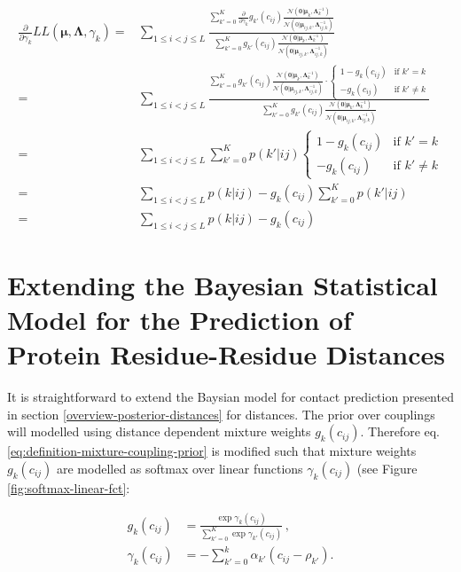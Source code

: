 \documentclass[11pt,a4paper,twoside]{book}
\newcommand{\Gauss}{\mathcal{N}}
\newcommand{\Lijk}{\mathbf{\Lambda}_{ij,k}}
\newcommand{\Lk}{\mathbf{\Lambda}_k}
\newcommand{\muijk}{\mathbf{\mu}_{ij,k}}
\newcommand{\muk}{\mathbf{\mu}_k}
\newcommand{\cij}{c_{ij}}
\theoremstyle{definition}
\theoremstyle{definition}
\theoremstyle{remark}
\begin{document}
\begin{align}
\frac{\partial} {\partial \gamma_k}     L\!L(\mathbf{\mu}, \mathbf{\Lambda}, \gamma_k) 
  =&  \sum_{1\le i<j\le L} \frac{\sum_{k'=0}^K  \frac{\partial}{\partial \gamma_k} g_{k'}(\cij)  
  \frac{\Gauss(\mathbf{0} | \muk, \Lk^{-1})}{\Gauss( 0 | \muijk, \Lijk^{-1})}}
  {\sum_{k'=0}^K g_{k'}(\cij)  \frac{  \Gauss(\mathbf{0} | \muk, \Lk^{-1})}{\Gauss( \mathbf{0} | \muijk, \Lijk^{-1})}} \nonumber \\
  =&  \sum_{1\le i<j\le L} \frac{\sum_{k'=0}^K  g_{k'}(\cij)  
  \frac{  \Gauss(\mathbf{0} | \muk, \Lk^{-1})}{\Gauss( \mathbf{0} | \muijk, \Lijk^{-1})} \cdot 
  \begin{cases} 
   1-g_k(\cij) & \text{if } k' = k \\
   -g_k(\cij)  & \text{if } k' \neq k
  \end{cases}}
  {\sum_{k'=0}^K g_{k'}(\cij)  \frac{  \Gauss(\mathbf{0} | \muk, \Lk^{-1})}{\Gauss( \mathbf{0} | \muijk, \Lijk^{-1})}} \nonumber\\
  =& \sum_{1\le i<j\le L} \sum_{k'=0}^K p(k'|ij) 
  \begin{cases} 
    1-g_k(\cij) & \text{if } k' = k \\
    -g_k(\cij)  & \text{if } k' \neq k 
  \end{cases} \nonumber\\
  =& \sum_{1 \leq i<j\leq L} p(k|ij) - g_k(\cij) \sum_{k'=0}^K p(k'|ij) \nonumber\\
  =& \sum_{1 \leq i<j\leq L} p(k|ij) - g_k(\cij)
\end{align}

\section{Extending the Bayesian Statistical Model for the Prediction of
Protein Residue-Residue
Distances}\label{extending-the-bayesian-statistical-model-for-the-prediction-of-protein-residue-residue-distances}

It is straightforward to extend the Baysian model for contact prediction
presented in section \ref{overview-posterior-distances} for distances.
The prior over couplings will modelled using distance dependent mixture
weights \(g_k(\cij)\). Therefore eq.
\eqref{eq:definition-mixture-coupling-prior} is modified such that mixture
weights \(g_k(\cij)\) are modelled as softmax over linear functions
\(\gamma_k(\cij)\) (see Figure \ref{fig:softmax-linear-fct}:

\begin{align}
      g_k(\cij)        &= \frac{\exp \gamma_k(\cij)}{\sum_{k'=0}^K \exp \gamma_{k'}(\cij)} \, , \\
      \gamma_k(\cij)   &= - \sum_{k'=0}^{k} \alpha_{k'} ( \cij - \rho_{k'}) .
\label{eq:definition-mixture-weights}
\end{align}
\end{document}
